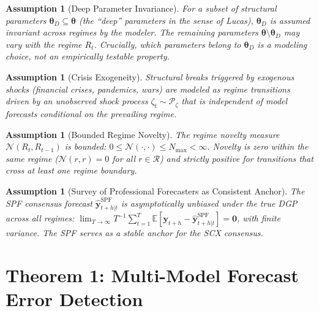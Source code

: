 \documentclass[12pt,a4paper]{article}
\newtheorem{assumption}[theorem]{Assumption}
\begin{document}
\begin{assumption}[Deep Parameter Invariance]
\label{ass:deep_invariance}
For a subset of structural parameters $\boldsymbol{\theta}_D \subseteq
\boldsymbol{\theta}$ (the ``deep'' parameters in the sense of Lucas),
$\boldsymbol{\theta}_D$ is \emph{assumed} invariant across regimes by
the modeler.  The remaining parameters $\boldsymbol{\theta} \setminus
\boldsymbol{\theta}_D$ may vary with the regime $R_t$.  Crucially,
which parameters belong to $\boldsymbol{\theta}_D$ is a modeling
\emph{choice}, not an empirically testable property.
\end{assumption}

\begin{assumption}[Crisis Exogeneity]
\label{ass:crisis_exog}
Structural breaks triggered by exogenous shocks (financial crises,
pandemics, wars) are modeled as regime transitions driven by an
unobserved shock process $\zeta_t \sim \mathcal{P}_\zeta$ that is
independent of model forecasts conditional on the prevailing regime.
\end{assumption}

\begin{assumption}[Bounded Regime Novelty]
\label{ass:bounded_novelty}
The regime novelty measure $\mathcal{N}(R_t, R_{t-1})$ is bounded:
$0 \leq \mathcal{N}(\cdot, \cdot) \leq N_{\max} < \infty$.  Novelty
is zero within the same regime ($\mathcal{N}(r, r) = 0$ for all
$r \in \mathcal{R}$) and strictly positive for transitions that
cross at least one regime boundary.
\end{assumption}

\begin{assumption}[Survey of Professional Forecasters as Consistent Anchor]
\label{ass:spf}
The SPF consensus forecast $\hat{\mathbf{y}}_{t+h|t}^{\text{SPF}}$ is
asymptotically unbiased under the true DGP across all regimes:
$\lim_{T \to \infty} T^{-1} \sum_{t=1}^{T} \mathbb{E}[\mathbf{y}_{t+h}
- \hat{\mathbf{y}}_{t+h|t}^{\text{SPF}}] = \mathbf{0}$, with finite
variance.  The SPF serves as a stable anchor for the SCX consensus.
\end{assumption}

\section{Theorem 1: Multi-Model Forecast Error Detection}
\label{sec:theorem1}
\end{document}
